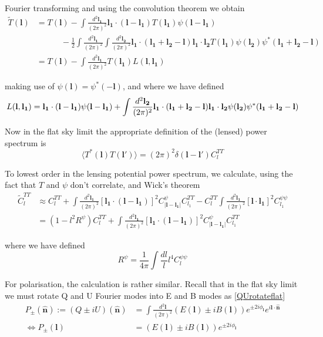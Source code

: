 \documentclass[a4paper,10pt]{article}
\renewcommand{\v}[1]{\mathbf{#1}}
\newcommand{\half}{\frac{1}{2}}
\newcommand{\finttwo}[1]{\int \frac{d^2 \v{#1}}{(2\pi)^2}}
\newcommand{\unit}[1]{\hat{\v{#1}}}
\begin{document}
Fourier transforming and using the convolution theorem we obtain
\begin{equation}\begin{split}
\tilde{T}(\v{l}) &= T(\v{l}) - \finttwo{l_1} \v{l_1}\cdot(\v{l}-\v{l_1})T(\v{l_1})\psi(\v{l}-\v{l_1}) \\
& \qquad \quad -\half \finttwo{l_1}\finttwo{l_2}\v{l_1}\cdot(\v{l_1}+\v{l_2}-\v{l})\v{l_1}\cdot\v{l_2}T(\v{l_1})\psi(\v{l_2})\psi^*(\v{l_1}+\v{l_2}-\v{l})\\
&= T(\v{l}) - \finttwo{l_1} T(\v{l_1})L(\v{l},\v{l_1})
\label{lensedtemp}
\end{split}\end{equation}

making use of $\psi(\v{l})=\psi^*(-\v{l})$, and where we have defined 
\begin{equation}
L(\v{l},\v{l_1}) = \v{l_1}\cdot(\v{l}-\v{l_1})\psi(\v{l}-\v{l_1})+\finttwo{l_2}\v{l_1}\cdot(\v{l_1}+\v{l_2}-\v{l})\v{l_1}\cdot\v{l_2}\psi(\v{l_2})\psi^*(\v{l_1}+\v{l_2}-\v{l})\\
\end{equation}

Now in the flat sky limit the appropriate definition of  the (lensed) power spectrum is
\begin{equation}
\langle T^*(\v{l})T(\v{l}')\rangle = (2\pi)^2\delta(\v{l}-\v{l}')C_l^{TT}
\end{equation}

To lowest order in the lensing potential power spectrum, we calculate, using the fact that $T$ and $\psi$ don't correlate, and Wick's theorem
\begin{equation}\begin{split}
\tilde{C}_l^{T T} &\approx C_l^{T T}+\finttwo{l_1}[ \v{l_1}\cdot(\v{l}-\v{l_1})]^2 C^\psi_{|\v{l}-\v{l_1}|}C_{l_1}^{TT} - C_l^{TT}\finttwo{l_1} [\v{l}\cdot\v{l_1}]^2C_{l_1}^{\psi\psi}\\
&=(1-l^2R^\psi)C_l^{TT}+\finttwo{l_1}[ \v{l_1}\cdot(\v{l}-\v{l_1})]^2 C^{\psi}_{|\v{l}-\v{l_1}|}C_{l_1}^{TT}
\end{split}\end{equation}

where we have defined
\begin{equation}
R^\psi = \frac{1}{4\pi}\int \frac{dl}{l} l^4 C_l^{\psi\psi}
\end{equation}

For polarisation, the calculation is rather similar. Recall that in the flat sky limit we must rotate Q and U Fourier modes into E and B modes as \ref{QUrotateflat}
\begin{equation}\begin{split}
 P_{\pm} (\unit{n}) := (Q\pm iU)(\unit{n})  &= \finttwo{l}(E(\v{l})\pm i B(\v{l}))e^{\pm 2i\phi_{\v{l}}}e^{i\v{l}\cdot\unit{n}}\\
\Leftrightarrow  P_{\pm}(\v{l}) &= (E(\v{l})\pm i B(\v{l}))e^{\pm 2i\phi_{\v{l}}}
\label{relationship}
\end{split}\end{equation}
\end{document}
